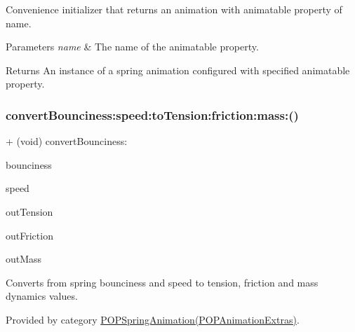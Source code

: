 Convenience initializer that returns an animation with animatable property of name. 
\begin{DoxyParams}{Parameters}
{\em name} & The name of the animatable property. \\
\hline
\end{DoxyParams}
\begin{DoxyReturn}{Returns}
An instance of a spring animation configured with specified animatable property. 
\end{DoxyReturn}
\mbox{\label{interface_p_o_p_spring_animation_a64169073c5afd559e939783a7f3f4065}} 
\subsubsection{\texorpdfstring{convert\+Bounciness\+:speed\+:to\+Tension\+:friction\+:mass\+:()}{convertBounciness:speed:toTension:friction:mass:()}\hspace{0.1cm}{\footnotesize\ttfamily [1/3]}}
{\footnotesize\ttfamily + (void) convert\+Bounciness\+: \begin{DoxyParamCaption}\item[{(C\+G\+Float)}]{bounciness }\item[{speed:(C\+G\+Float)}]{speed }\item[{toTension:(C\+G\+Float $\ast$)}]{out\+Tension }\item[{friction:(C\+G\+Float $\ast$)}]{out\+Friction }\item[{mass:(C\+G\+Float $\ast$)}]{out\+Mass }\end{DoxyParamCaption}}

Converts from spring bounciness and speed to tension, friction and mass dynamics values. 

Provided by category \mbox{\hyperlink{category_p_o_p_spring_animation_07_p_o_p_animation_extras_08_a64169073c5afd559e939783a7f3f4065}{P\+O\+P\+Spring\+Animation(\+P\+O\+P\+Animation\+Extras)}}.

\mbox{\label{interface_p_o_p_spring_animation_a64169073c5afd559e939783a7f3f4065}} 
